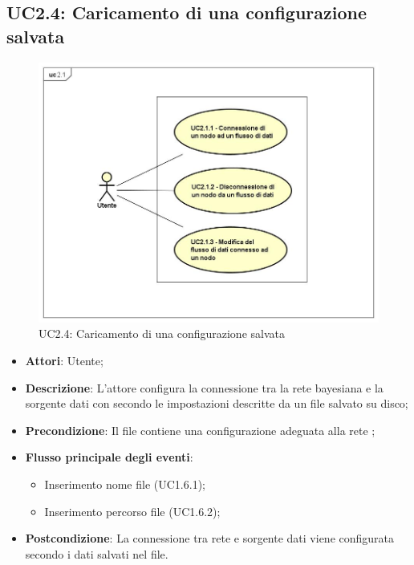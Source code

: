 \subsection{UC2.4: Caricamento di una configurazione salvata}
\begin{figure} [H]
	\centering
	\includegraphics[scale=0.45]{Img/UC2-1}
	\caption{UC2.4: Caricamento di una configurazione salvata}\label{}
\end{figure}
\begin{itemize}
	\item \textbf{Attori}: Utente;
	\item \textbf{Descrizione}: L'attore configura la connessione tra la rete bayesiana e la sorgente dati con secondo le impostazioni descritte da un file salvato su disco;
	\item \textbf{Precondizione}: Il file contiene una configurazione adeguata alla rete ;
	\item \textbf{Flusso principale degli eventi}:
	\begin{itemize}
		\item Inserimento nome file (UC1.6.1);
		\item Inserimento percorso file (UC1.6.2);
	\end{itemize}
	\item \textbf{Postcondizione}: La connessione tra rete e sorgente dati viene configurata secondo i dati salvati nel file.
\end{itemize}

